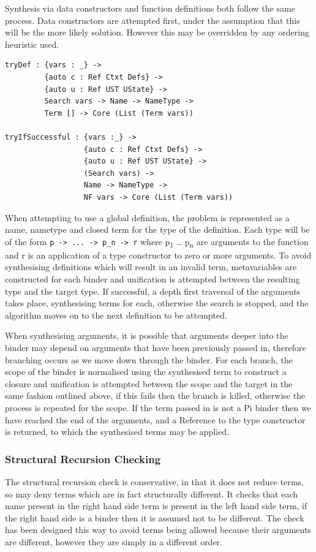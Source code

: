 \documentclass[a4paper]{article}
\begin{document}
Synthesis via data constructors and function definitions
both follow the same process. Data constructors are attempted
first, under the assumption that this will be the more likely solution.
However this may be overridden by any ordering heuristic used.

\begin{center}
\begin{verbatim}
tryDef : {vars : _} ->
		 {auto c : Ref Ctxt Defs} -> 
		 {auto u : Ref UST UState} ->
		 Search vars -> Name -> NameType ->
		 Term [] -> Core (List (Term vars))

tryIfSuccessful : {vars :_} ->
				  {auto c : Ref Ctxt Defs} ->
				  {auto u : Ref UST UState} ->
				  (Search vars) ->
				  Name -> NameType ->
				  NF vars -> Core (List (Term vars))
\end{verbatim}
\end{center}

When attempting to use a global definition, the problem is represented as a
name, nametype and closed term for the type of the definition. 
Each type will be of the form \texttt{p -> ... -> p\_n -> r} where p\textsubscript{1} \ldots{} p\textsubscript{n} are 
arguments to the function and r is an application of a type constructor
to zero or more arguments. To avoid synthesising definitions which 
will result in an invalid term, metavariables are constructed for each binder and 
unification is attempted between the resulting type and the target type. If 
successful, a depth first traversal of the arguments takes place, synthesising terms for 
each, otherwise the search is stopped, and the algorithm
moves on to the next definition to be attempted. 

When synthesising arguments, it is possible that arguments deeper into the binder
may depend on arguments that have been previously passed in, therefore branching 
occurs as we move down through the binder. For each branch, the scope of the binder
is normalised using the synthesised term to construct a closure and unification is 
attempted between the scope and the target in the same fashion outlined above, 
if this fails then the branch is killed, otherwise the process is repeated for the 
scope. If the term passed in is not a Pi binder then we have reached the end of the 
arguments, and a Reference to the type constructor is returned, to which the 
synthesised terms may be applied. 

\subsubsection{Structural Recursion Checking}
\label{sec:orgd5ccdd8}
The structural recursion check is conservative, in that it does not reduce terms, 
so may deny terms which are in fact structurally different. It checks that each name
present in the right hand side term is present in the left hand side term, if the right 
hand side is a binder then it is assumed not to be different. The check has been designed
this way to avoid terms being allowed because their arguments are different, however they 
are simply in a different order.  	
\end{document}
